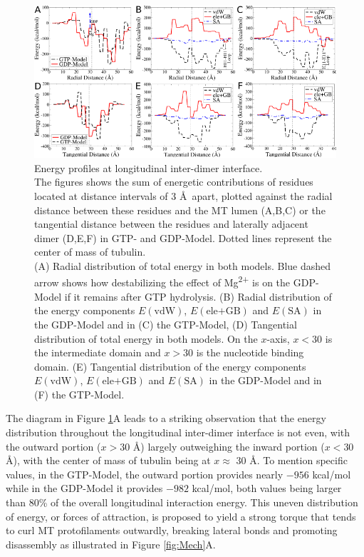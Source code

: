 \documentclass[11pt]{report}
\begin{document}
\begin{figure}
  \centering 
  \includegraphics[width=0.99\linewidth]{images/Edist.pdf}
  \caption[Energy profiles at longitudinal inter-dimer interface.]{{Energy profiles at longitudinal inter-dimer interface.} 
  \\
  The figures
  shows the sum of energetic contributions of residues located at distance
  intervals of 3 \AA\ apart, plotted against the radial distance between 
  these residues and the MT lumen (A,B,C) or the tangential distance between the
  residues and laterally adjacent dimer (D,E,F) in GTP- and GDP-Model. Dotted lines represent the center of mass of tubulin.\\
  (A) Radial distribution of total energy in both models. Blue dashed arrow shows how destabilizing the effect of Mg\textsuperscript{2+} is on the GDP-Model if it remains
  after GTP hydrolysis.
  (B) Radial distribution of the energy components $E(\text{vdW})$, $E(\text{ele+GB})$ and 
  $E(\text{SA})$ in the GDP-Model and in (C) the GTP-Model,
  (D) Tangential distribution of total energy in both models. On the $x$-axis, $x<30$ is the intermediate domain and $x>30$ is the nucleotide binding domain. 
  (E) Tangential distribution of the energy components $E(\text{vdW})$, $E(\text{ele+GB})$ and 
    $E(\text{SA})$ in the GDP-Model and in (F) the GTP-Model.
  }
  \label{fig:Edist}
\end{figure}

The diagram
in Figure \ref{fig:Edist}A leads to a striking observation that
the energy distribution throughout the longitudinal
inter-dimer interface is not even,
with the outward portion ($x > 30$ \AA) largely outweighing the inward portion ($x < 30$ \AA), with the center of mass
of tubulin being at $x \approx$ 30 \AA. To mention specific values, in the GTP-Model, the outward
portion provides nearly $-956$ kcal/mol while in the GDP-Model it provides
$-982$ kcal/mol, both values being larger than 80\% of the overall
longitudinal interaction energy. This uneven distribution of energy, 
or forces of attraction, is
proposed to yield a strong torque that
tends to curl MT protofilaments outwardly,
breaking lateral bonds and promoting disassembly as illustrated in 
Figure \ref{fig:Mech}A. 
\end{document}
